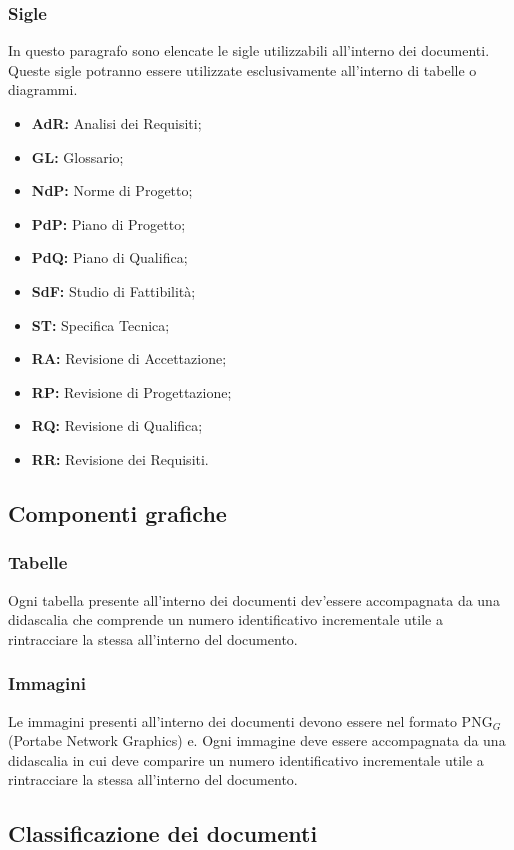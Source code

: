 \subsubsection{Sigle}
In questo paragrafo sono elencate le sigle utilizzabili all'interno dei documenti. Queste sigle potranno essere utilizzate esclusivamente all'interno di tabelle o diagrammi.
\begin{itemize}
\item \textbf{AdR:} Analisi dei Requisiti;
\item \textbf{GL:} Glossario;
\item \textbf{NdP:} Norme di Progetto;
\item \textbf{PdP:} Piano di Progetto;
\item \textbf{PdQ:} Piano di Qualifica;
\item \textbf{SdF:} Studio di Fattibilità;
\item \textbf{ST:} Specifica Tecnica;
\item \textbf{RA:} Revisione di Accettazione;
\item \textbf{RP:} Revisione di Progettazione;
\item \textbf{RQ:} Revisione di Qualifica;
\item \textbf{RR:} Revisione dei Requisiti.
\end{itemize}

\subsection{Componenti grafiche}
\subsubsection{Tabelle}
Ogni tabella presente all’interno dei documenti dev’essere accompagnata da una didascalia che comprende un numero identificativo incrementale utile a rintracciare la stessa all’interno del documento.

\subsubsection{Immagini}
Le immagini presenti all'interno dei documenti devono essere nel formato PNG$_G$ (Portabe Network Graphics) e. Ogni immagine deve essere accompagnata da una didascalia in cui deve comparire un numero identificativo incrementale utile a rintracciare la stessa all’interno del documento.

\subsection{Classificazione dei documenti}
